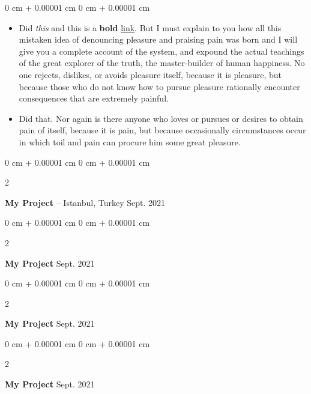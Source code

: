 \documentclass[10pt, letterpaper]{article}
\newenvironment{highlights}{
    \begin{itemize}[
        topsep=0.10 cm,
        parsep=0.10 cm,
        partopsep=0pt,
        itemsep=0pt,
        leftmargin=0 cm + 10pt
    ]
}{
    \end{itemize}
} %
\newenvironment{onecolentry}{
    \begin{adjustwidth}{
        0 cm + 0.00001 cm
    }{
        0 cm + 0.00001 cm
    }
}{
    \end{adjustwidth}
} %
\newenvironment{twocolentry}[2][]{
    \onecolentry
    \def\secondColumn{#2}
    \setcolumnwidth{\fill, 4.5 cm}
    \begin{paracol}{2}
}{
    \switchcolumn \raggedleft \secondColumn
    \end{paracol}
    \endonecolentry
} %
\begin{document}
        \vspace{0.10 cm}
        \begin{onecolentry}
            \begin{highlights}
                \item Did \textit{this} and this is a \textbf{bold} \href{https://example.com}{link}. But I must explain to you how all this mistaken idea of denouncing pleasure and praising pain was born and I will give you a complete account of the system, and expound the actual teachings of the great explorer of the truth, the master-builder of human happiness. No one rejects, dislikes, or avoids pleasure itself, because it is pleasure, but because those who do not know how to pursue pleasure rationally encounter consequences that are extremely painful.
                \item Did that. Nor again is there anyone who loves or pursues or desires to obtain pain of itself, because it is pain, but because occasionally circumstances occur in which toil and pain can procure him some great pleasure.
            \end{highlights}
        \end{onecolentry}


        \vspace{0.2 cm}

        \begin{twocolentry}{
            Sept. 2021
        }
            \textbf{My Project} -- Istanbul, Turkey\end{twocolentry}



        \vspace{0.2 cm}

        \begin{twocolentry}{
            Sept. 2021
        }
            \textbf{My Project}\end{twocolentry}



        \vspace{0.2 cm}

        \begin{twocolentry}{
            Sept. 2021
        }
            \textbf{My Project}\end{twocolentry}



        \vspace{0.2 cm}

        \begin{twocolentry}{
            Sept. 2021
        }
            \textbf{My Project}\end{twocolentry}
\end{document}

